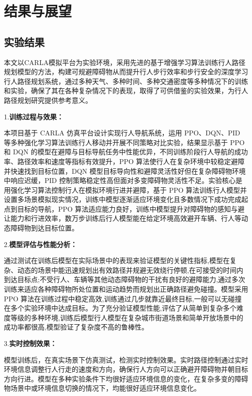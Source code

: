 \chapter{结果与展望}

\section{实验结果}

本文以CARLA模拟平台为实验环境，采用先进的基于增强学习算法训练行人路径规划模型的方法，构建可规避障碍物从而提升行人步行效率和步行安全的深度学习行人路径规划系统，通过多种天气、多种时间、多种交通密度等多种情况下的训练和实验，确保了其在各种复杂情况下的表现，取得了可供借鉴的实验效果，为行人路径规划研究提供参考意义。

1.\textbf{训练过程与效果：}

本项目基于 CARLA 仿真平台设计实现行人导航系统，运用 PPO、DQN、PID 等多种强化学习算法训练行人移动并开展不同策略对比实验，结果显示基于 PPO 和 DQN 的模型在避障与目标导航任务中性能优异，不同训练阶段行人导航的成功率、路径效率和速度等指标有效提升，PPO 算法使行人在复杂环境中较稳定避障并快速找到目标位置，DQN 模型目标导向性和避障灵活性好但在复杂障碍物环境中响应迟缓，PID 控制策略稳定性高但面对多变障碍物灵活性不足。实验核心是用强化学习算法控制行人在模拟环境行进并避障，基于 PPO 算法训练行人模型并设置多场景模拟现实情况，训练中模型逐渐适应环境变化且多数情况下成功完成起点到目标的导航，PPO 算法适应能力良好，训练中模型提升对障碍物的感知与避让能力和行进效率，数万步训练后行人模型能在给定环境高效避开车辆、行人等动态障碍物到达目标位置。

2.\textbf{模型评估与性能分析：}

通过测试在训练后模型在实际场景中的表现来验证模型的关键性指标,模型在复杂、动态的场景中能迅速规划出有效路径并规避无效绕行停顿,在可接受的时间内到达目标点;不受行人、车辆等其他动态障碍物的干扰有良好的避障能力,通过多次训练来适应各种障碍物所处位置和运动趋势而规划出正确路径避免碰撞。模型采用 PPO 算法在训练过程中稳定高效,训练通过几步就靠近最终目标,一般可以无碰撞在多个实验环境中达成目标。为了充分验证模型性能,评估了从简单到复杂多个难度等级的多种环境,训练后模型行人模型在复杂城市街道场景和简单开放场景中的成功率都很高,模型验证了复杂度不高的鲁棒性。

3.\textbf{实时控制效果：}

模型训练后，在真实场景下仿真测试，检测实时控制效果。实时路径控制通过实时环境信息调整行人行走的速度和方向，确保行人方向可以正确避开障碍物并朝目标方向行进。模型在多种实验条件下均很好适应环境信息的变化，在复杂多变的障碍物场景中或环境信息切换的情况下，均能很好适应环境信息变化。

